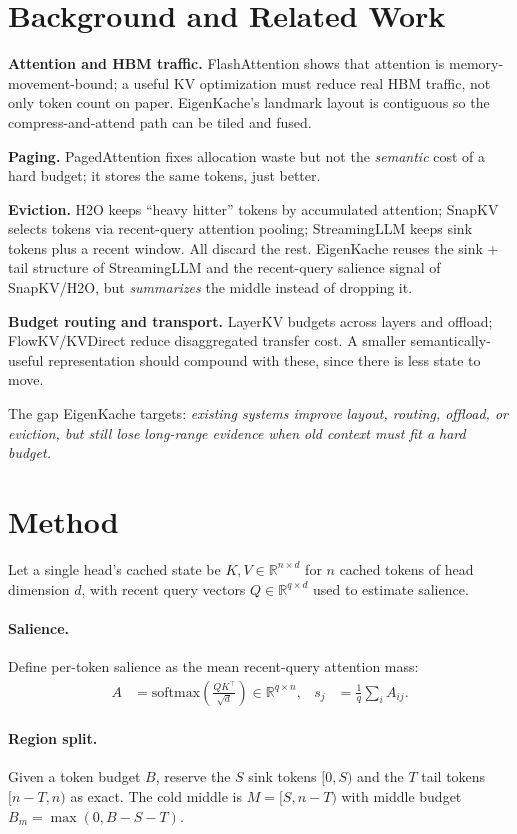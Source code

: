\documentclass[10pt,twocolumn]{article}
\begin{document}
\section{Background and Related Work}
\textbf{Attention and HBM traffic.} FlashAttention shows that attention is
memory-movement-bound; a useful KV optimization must reduce real HBM traffic,
not only token count on paper. EigenKache's landmark layout is contiguous so the
compress-and-attend path can be tiled and fused.

\textbf{Paging.} PagedAttention fixes allocation waste but not the
\emph{semantic} cost of a hard budget; it stores the same tokens, just better.

\textbf{Eviction.} H2O keeps ``heavy hitter'' tokens by accumulated attention;
SnapKV selects tokens via recent-query attention pooling; StreamingLLM keeps
sink tokens plus a recent window. All discard the rest. EigenKache reuses the
sink + tail structure of StreamingLLM and the recent-query salience signal of
SnapKV/H2O, but \emph{summarizes} the middle instead of dropping it.

\textbf{Budget routing and transport.} LayerKV budgets across layers and
offload; FlowKV/KVDirect reduce disaggregated transfer cost. A smaller
semantically-useful representation should compound with these, since there is
less state to move.

The gap EigenKache targets: \emph{existing systems improve layout, routing,
offload, or eviction, but still lose long-range evidence when old context must
fit a hard budget.}

\section{Method}
Let a single head's cached state be $K, V \in \mathbb{R}^{n \times d}$ for $n$
cached tokens of head dimension $d$, with recent query vectors
$Q \in \mathbb{R}^{q \times d}$ used to estimate salience.

\paragraph{Salience.} Define per-token salience as the mean recent-query
attention mass:
\begin{align}
A &= \mathrm{softmax}\!\left(\tfrac{Q K^\top}{\sqrt{d}}\right) \in \mathbb{R}^{q \times n}, &
s_j &= \tfrac{1}{q}\textstyle\sum_{i} A_{ij}.
\end{align}

\paragraph{Region split.} Given a token budget $B$, reserve the $S$ sink tokens
$[0,S)$ and the $T$ tail tokens $[n{-}T, n)$ as exact. The cold middle is
$M = [S, n{-}T)$ with middle budget $B_m = \max(0, B - S - T)$.
\end{document}
